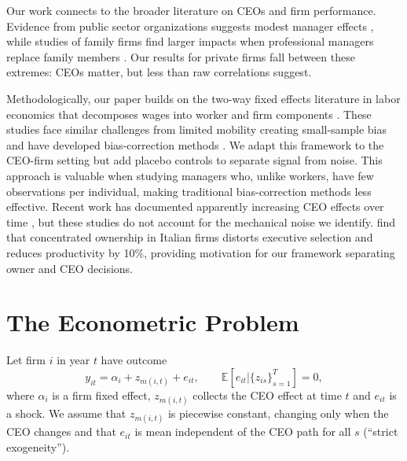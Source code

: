 \documentclass[11pt,a4paper]{article}
\begin{document}
Our work connects to the broader literature on CEOs and firm performance. Evidence from public sector organizations suggests modest manager effects \citep{fenizia2022managers, janke2024role}, while studies of family firms find larger impacts when professional managers replace family members \citep{bennedsen2007inside, sraer2007performance}. Our results for private firms fall between these extremes: CEOs matter, but less than raw correlations suggest.

Methodologically, our paper builds on the two-way fixed effects literature in labor economics that decomposes wages into worker and firm components \citep{Abowd1999Econometrica, Card2018JoLE}. These studies face similar challenges from limited mobility creating small-sample bias \citep{andrews2008high} and have developed bias-correction methods \citep{Bonhomme2023-dx, gaure2014correlation}. We adapt this framework to the CEO-firm setting but add placebo controls to separate signal from noise. This approach is valuable when studying managers who, unlike workers, have few observations per individual, making traditional bias-correction methods less effective. Recent work has documented apparently increasing CEO effects over time \citep{quigley2015has}, but these studies do not account for the mechanical noise we identify. \citet{lippi2014corporate} find that concentrated ownership in Italian firms distorts executive selection and reduces productivity by 10\%, providing motivation for our framework separating owner and CEO decisions.

\section{The Econometric Problem}

Let firm $i$ in year $t$ have outcome
\begin{equation}\label{eq:model1}
  y_{it} = \alpha_i + z_{m(i,t)} + e_{it},\qquad \mathbb E[e_{it}|\{z_{is}\}_{s=1}^T]=0,
\end{equation}
where $\alpha_i$ is a firm fixed effect, $z_{m(i,t)}$ collects the CEO effect at time $t$ and $e_{it}$ is a shock. We assume that $z_{m(i,t)}$ is piecewise constant, changing only when the CEO changes and that $e_{it}$ is mean independent of the CEO path for all $s$ (``strict exogeneity'').
\end{document}
